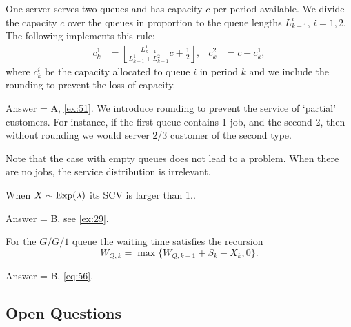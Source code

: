\begin{exercise}[201904]
  One server serves two queues and has capacity $c$ per period available.
  We divide the capacity $c$ over the queues in proportion to the queue lengths $L^i_{k-1}$, $i=1,2$.
  The following implements this rule:
    \begin{align*}
      c_k^1 &= \left\lfloor \frac{L_{k-1}^1}{L_{k-1}^1 + L_{k-1}^2} c + \frac 1 2 \right\rfloor, & c_k^2 &= c - c_k^1,
    \end{align*}
    where $c_k^i$ be the capacity allocated to queue $i$ in period $k$ and we include the rounding to prevent the loss of capacity.

\begin{solution}
      Answer = A, \ref{ex:51}.
      We introduce rounding to prevent the service of `partial' customers.
      For instance, if the first queue contains 1 job, and the second 2, then without rounding we would server $2/3$ customer of the second type.

      Note that the case with empty queues does not lead to a problem.
      When there are no jobs, the service distribution is irrelevant.
\end{solution}
\end{exercise}


\begin{exercise}[201904]
When  $X\sim\operatorname{Exp}(\lambda)$ its SCV is larger than 1..
\begin{solution} Answer = B, see \ref{ex:29}.
\end{solution}
\end{exercise}

\begin{exercise}[201904]
  For the $G/G/1$ queue the waiting time satisfies the recursion
  \begin{equation*}
  W_{Q,k} = \max\{W_{Q,k-1} + S_{k}-X_k, 0\}.
  \end{equation*}
\begin{solution} Answer = B, \eqref{eq:56}.
\end{solution}
\end{exercise}


\subsection{Open Questions}



